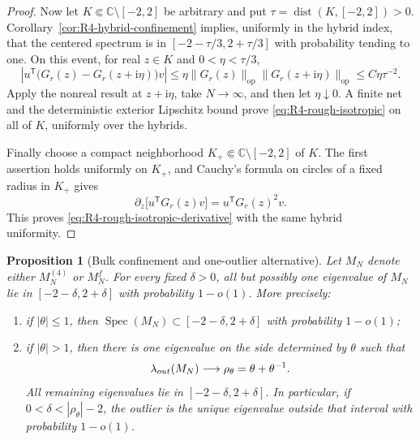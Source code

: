 \documentclass[10pt,a4paper]{amsart}
\newtheorem{proposition}[theorem]{Proposition}
\newcommand{\spec}{\operatorname{Spec}}
\newcommand{\ii}{\mathrm i}
\newcommand{\op}{\mathrm{op}}
\newcommand{\norm}[1]{\lVert #1\rVert}
\begin{document}
\begin{proof}
Now let \(K\Subset\mathbb C\setminus[-2,2]\) be arbitrary and put
\(\tau=\operatorname{dist}(K,[-2,2])>0\).
Corollary~\ref{cor:R4-hybrid-confinement}
implies, uniformly in the hybrid index, that the centered spectrum is in
\([-2-\tau/3,2+\tau/3]\) with probability tending to one.  On this event,
for real \(z\in K\) and \(0<\eta<\tau/3\),
\[
 \left|u^{\mathsf T}\bigl(G_r(z)-G_r(z+\ii\eta)\bigr)v\right|
 \le\eta\norm{G_r(z)}_{\op}\norm{G_r(z+\ii\eta)}_{\op}
 \le C\eta\tau^{-2}.
\]
Apply the nonreal result at \(z+\ii\eta\), take \(N\to\infty\), and then
let \(\eta\downarrow0\).  A finite net and the deterministic exterior
Lipschitz bound prove \eqref{eq:R4-rough-isotropic} on all of \(K\), uniformly
over the hybrids.

Finally choose a compact neighborhood
\(K_+\Subset\mathbb C\setminus[-2,2]\) of \(K\).  The first assertion holds
uniformly on \(K_+\), and Cauchy's formula on circles of a fixed radius in
\(K_+\) gives
\[
 \partial_z\bigl[u^{\mathsf T}G_r(z)v\bigr]
 =u^{\mathsf T}G_r(z)^2v.
\]
This proves \eqref{eq:R4-rough-isotropic-derivative} with the same hybrid
uniformity.
\end{proof}

\begin{proposition}[Bulk confinement and one-outlier alternative]
\label{prop:R4-outlier-separation}
Let \(M_N\) denote either \(M_N^{(4)}\) or \(M_N^f\).  For every fixed
\(\delta>0\), all but possibly one eigenvalue of \(M_N\) lie in
\([-2-\delta,2+\delta]\) with probability \(1-o(1)\).  More precisely:
\begin{enumerate}[label=(\roman*)]
\item if \(|\theta|\le1\), then
\(\spec(M_N)\subset[-2-\delta,2+\delta]\) with probability \(1-o(1)\);
\item if \(|\theta|>1\), then there is one eigenvalue on the side determined
by \(\theta\) such that
\begin{equation}\label{eq:R4-outlier-convergence}
 \lambda_{\rm out}(M_N)\longrightarrow
 \rho_\theta=\theta+\theta^{-1}.
\end{equation}
All remaining eigenvalues lie in \([-2-\delta,2+\delta]\).  In particular,
if \(0<\delta<|\rho_\theta|-2\), the outlier is the unique eigenvalue outside
that interval with probability \(1-o(1)\).
\end{enumerate}
\end{proposition}
\end{document}
